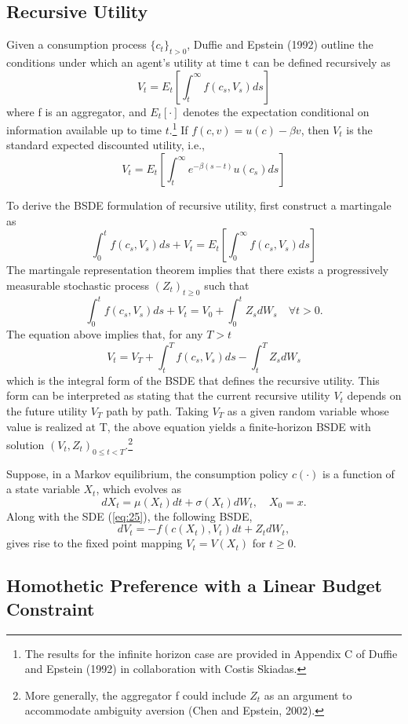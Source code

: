 \documentclass{article}
\begin{document}
\subsection{Recursive Utility}

Given a consumption process $\{c_{t}\}_{t>0}$, Duffie and Epstein (1992) outline the conditions under which an agent's utility at time t can be defined recursively as
\[
V_{t}=E_{t}\left[\int_{t}^{\infty}f(c_{s},V_{s})ds\right]
\]
where f is an aggregator, and $E_{t}[\cdot]$ denotes the expectation conditional on information available up to time $t$.\footnote{The results for the infinite horizon case are provided in Appendix C of Duffie and Epstein (1992) in collaboration with Costis Skiadas.} If $f(c,v)=u(c)-\beta v$, then $V_{t}$ is the standard expected discounted utility, i.e.,
\[
V_{t}=E_{t}\left[\int_{t}^{\infty}e^{-\beta(s-t)}u(c_{s})ds\right]
\]

\clearpage

To derive the BSDE formulation of recursive utility, first construct a martingale as
\[
\int_{0}^{t}f(c_{s},V_{s})ds+V_{t}=E_{t}\left[\int_{0}^{\infty}f(c_{s},V_{s})ds\right]
\]
The martingale representation theorem implies that there exists a progressively measurable stochastic process $(Z_{t})_{t\ge0}$ such that
\[
\int_{0}^{t}f(c_{s},V_{s})ds+V_{t}=V_{0}+\int_{0}^{t}Z_{s}dW_{s} \quad \forall t>0.
\]
The equation above implies that, for any $T>t$
\[
V_{t}=V_{T}+\int_{t}^{T}f(c_{s},V_{s})ds-\int_{t}^{T}Z_{s}dW_{s}
\]
which is the integral form of the BSDE that defines the recursive utility. This form can be interpreted as stating that the current recursive utility $V_{t}$ depends on the future utility $V_{T}$ path by path. Taking $V_{T}$ as a given random variable whose value is realized at T, the above equation yields a finite-horizon BSDE with solution $(V_{t},Z_{t})_{0\le t<T}$.\footnote{More generally, the aggregator f could include $Z_{t}$ as an argument to accommodate ambiguity aversion (Chen and Epstein, 2002).}

Suppose, in a Markov equilibrium, the consumption policy $c(\cdot)$ is a function of a state variable $X_{t}$, which evolves as
\begin{equation}
dX_{t}=\mu(X_{t})dt+\sigma(X_{t})dW_{t}, \quad X_{0}=x.
\label{eq:25}
\end{equation}
Along with the SDE (\ref{eq:25}), the following BSDE,
\[
dV_{t}=-f(c(X_{t}),V_{t})dt+Z_{t}dW_{t},
\]
gives rise to the fixed point mapping $V_{t}=V(X_{t})$ for $t\ge0$.

\subsection{Homothetic Preference with a Linear Budget Constraint}
\end{document}
